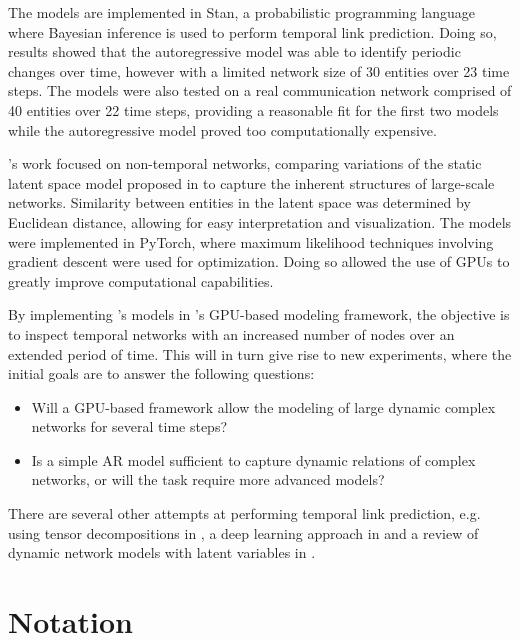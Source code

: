     The models are implemented in Stan, a probabilistic programming language where Bayesian inference is used to perform temporal link prediction. Doing so, results showed that the autoregressive model was able to identify periodic changes over time, however with a limited network size of 30 entities over 23 time steps. The models were also tested on a real communication network comprised of 40 entities over 22 time steps, providing a reasonable fit for the first two models while the autoregressive model proved too computationally expensive. 
    
    \citeauthor{jacobsen2018a}'s work focused on non-temporal networks, comparing variations of the static latent space model proposed in \cite{hoff2002latent} to capture the inherent structures of large-scale networks. 
    Similarity between entities in the latent space was determined by Euclidean distance, allowing for easy interpretation and visualization.
    The models were implemented in PyTorch, where maximum likelihood techniques involving gradient descent were used for optimization. Doing so allowed the use of GPUs to greatly improve computational capabilities.
    
    By implementing \citeauthor{zangenberg2018a}'s models in \citeauthor{jacobsen2018a}'s GPU-based modeling framework, the objective is to inspect temporal networks with an increased number of nodes over an extended period of time. This will in turn give rise to new experiments, where the initial goals are to answer the following questions:
    \begin{itemize}\itshape
        \item Will a GPU-based framework allow the modeling of large dynamic complex networks for several time steps?
        \item Is a simple AR model sufficient to capture dynamic relations of complex networks, or will the task require more advanced models?
    \end{itemize}
    
    There are several other attempts at performing temporal link prediction, e.g. using tensor decompositions in \cite{dunlavy2011temporal}, a deep learning approach in \cite{li2014deep} and a review of dynamic network models with latent variables in \cite{kim2018review}.
    
\section{Notation}


